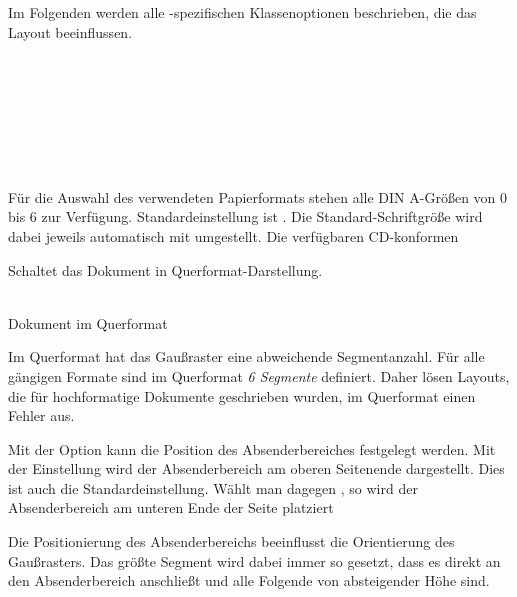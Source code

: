 Im Folgenden werden alle \tubslatex-spezifischen Klassenoptionen beschrieben,
die das Layout beeinflussen.

\begin{Declaration}
  \\
  \\
  \\
  \\
  \\
  \\
\end{Declaration}

Für die Auswahl des verwendeten Papierformats stehen alle DIN A-Größen von
0 bis 6 zur Verfügung. Standardeinstellung ist .
Die Standard-Schriftgröße wird dabei jeweils automatisch mit umgestellt.
Die verfügbaren \acs{CD}-konformen 

\begin{Declaration}
\end{Declaration}

Schaltet das Dokument in Querformat-Darstellung.

\begin{center}
  \\
  Dokument im Querformat
\end{center}


\begin{important}
  Im Querformat hat das Gaußraster eine abweichende
  Segmentanzahl. Für alle gängigen Formate sind im Querformat \emph{6 Segmente}
  definiert. Daher lösen Layouts, die für hochformatige Dokumente
  geschrieben wurden, im Querformat einen Fehler aus.
\end{important}


\begin{Declaration}
\end{Declaration}

Mit der Option  kann die Position des Absenderbereiches
festgelegt werden. Mit der Einstellung  wird
der Absenderbereich am oberen Seitenende dargestellt. Dies ist auch die
Standardeinstellung. Wählt man dagegen , so
wird der Absenderbereich am unteren Ende der Seite platziert

\begin{important}
  Die Positionierung des Absenderbereichs beeinflusst die Orientierung des
  Gaußrasters. Das größte Segment wird dabei immer so gesetzt, dass es direkt
  an den Absenderbereich anschließt und alle Folgende von absteigender Höhe sind.
\end{important}


